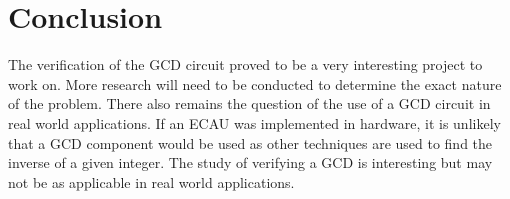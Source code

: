 \documentclass[12pt]{report}
\begin{document}
\section{Conclusion}

The verification of the GCD circuit proved to be a very interesting project to work on. More research will need to be conducted to determine the exact nature of the problem. There also remains the question of the use of a GCD circuit in real world applications. If an ECAU was implemented in hardware, it is unlikely that a GCD component would be used as other techniques are used to find the inverse of a given integer. The study of verifying a GCD is interesting but may not be as applicable in real world applications.



%
\end{document}
